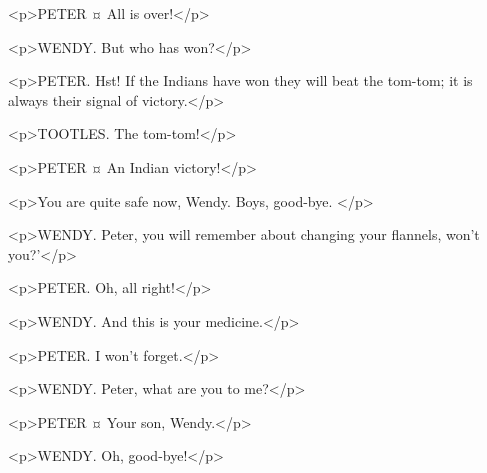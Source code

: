 <p>PETER ¤
All is over!</p>

<p>WENDY. But who has won?</p>

<p>PETER. Hst! If the Indians have won they will beat the tom-tom; it is always their signal of victory.</p>


<p>TOOTLES. The tom-tom!</p>

<p>PETER ¤
An Indian victory!</p>


<p>You are quite safe now, Wendy. Boys, good-bye.
</p>

<p>WENDY. Peter, you will remember about changing your flannels, won't you?'</p>

<p>PETER. Oh, all right!</p>

<p>WENDY. And this is your medicine.</p>


<p>PETER. I won't forget.</p>

<p>WENDY. Peter, what are you to me?</p>

<p>PETER ¤
Your son, Wendy.</p>

<p>WENDY. Oh, good-bye!</p>


